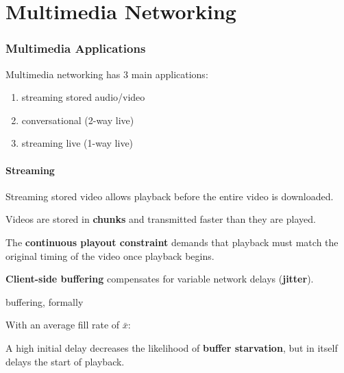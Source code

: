 \part{Multimedia Networking}

\section{Multimedia Applications}
Multimedia networking has 3 main applications:

\begin{enumerate}
    \item streaming stored audio/video
    \item conversational (2-way live)
    \item streaming live (1-way live)
\end{enumerate}

\subsection{Streaming}
Streaming stored video allows playback before the entire video is downloaded.

Videos are stored in \textbf{chunks} and transmitted faster than they are played.

The \textbf{continuous playout constraint} demands that playback must match the original
timing of the video once playback begins.

\textbf{Client-side buffering} compensates for variable network delays (\textbf{jitter}).

\begin{defn*}{buffering, formally}
    \begin{itemize}
    \end{itemize}

    With an average fill rate of $\bar{x}$:
    \begin{itemize}
    \end{itemize}

    A high initial delay decreases the likelihood of \textbf{buffer starvation}, but in itself
    delays the start of playback.
\end{defn*}

